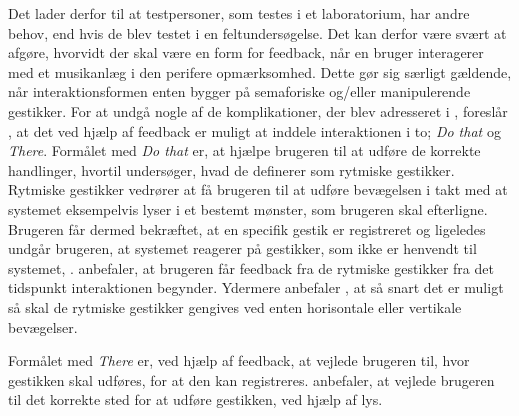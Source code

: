 Det lader derfor til at testpersoner, som testes i et laboratorium, har andre behov, end hvis de blev testet i en feltundersøgelse. Det kan derfor være svært at afgøre, hvorvidt der skal være en form for feedback, når en bruger interagerer med et musikanlæg i den perifere opmærksomhed. Dette gør sig særligt gældende, når interaktionsformen enten bygger på semaforiske og/eller manipulerende gestikker. \blankline 
%
For at undgå nogle af de komplikationer, der blev adresseret i , foreslår \textcite{PDF:DoThatThere}, at det ved hjælp af feedback er muligt at inddele interaktionen i to; \textit{Do that} og \textit{There}. Formålet med \textit{Do that} er, at hjælpe brugeren til at udføre de korrekte handlinger, hvortil \textcite[s. 4]{PDF:DoThatThere} undersøger, hvad de definerer som rytmiske gestikker. Rytmiske gestikker vedrører at få brugeren til at udføre bevægelsen i takt med at systemet eksempelvis lyser i et bestemt mønster, som brugeren skal efterligne. Brugeren får dermed bekræftet, at en specifik gestik er registreret og ligeledes undgår brugeren, at systemet reagerer på gestikker, som ikke er henvendt til systemet, \parencite[s. 4]{PDF:DoThatThere}. \textcite[s. 10]{PDF:DoThatThere} anbefaler, at brugeren får feedback fra de rytmiske gestikker fra det tidspunkt interaktionen begynder. Ydermere anbefaler \textcite[s. 10]{PDF:DoThatThere}, at så snart det er muligt så skal de rytmiske gestikker gengives ved enten horisontale eller vertikale bevægelser. 

Formålet med \textit{There} er, ved hjælp af feedback, at vejlede brugeren til, hvor gestikken skal udføres, for at den kan registreres. \textcite[s. 10]{PDF:DoThatThere} anbefaler, at vejlede brugeren til det korrekte sted for at udføre gestikken, ved hjælp af lys. 
